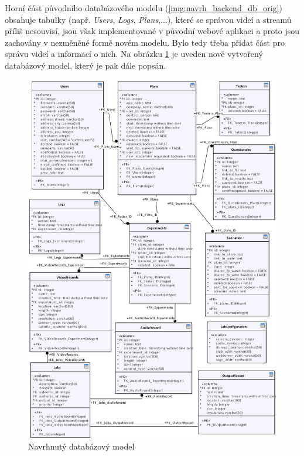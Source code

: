 \documentclass[thesis=M,czech]{FITthesis}[2012/06/26]
\begin{document}
Horní část původního databázového modelu (\ref{img:navrh_backend_db_orig}) obsahuje tabulky (např. \textit{Users}, \textit{Logs}, \textit{Plans},...), které se správou videí a streamů příliš nesouvisí, jsou však implementované v původní webové aplikaci a proto jsou zachovány v nezměněné formě novém modelu. Bylo tedy třeba přidat část pro správu videí a informací o nich. Na obrázku \ref{img:navrh_backend_db} je uveden nově vytvořený databázový model, který je pak dále popsán.
\\
\begin{figure}[h]\centering
	\includegraphics[width=1\textwidth]{images/db.eps}
	\caption{Navrhnutý databázový model}\label{img:navrh_backend_db}
\end{figure}
\end{document}
